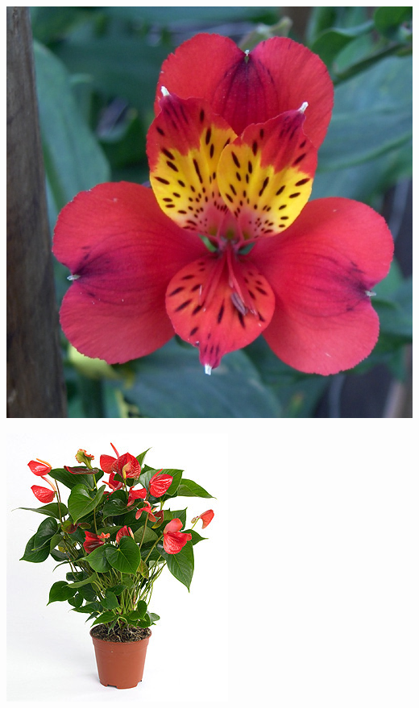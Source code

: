 \documentclass{article}
\begin{document}
\begin{center}
\includegraphics[width=0.9\textheight, angle=90]{../Alstroemeria2.jpg}
\end{center}
\newpage

\begin{center}
\includegraphics[width=0.9\textheight, angle=90]{../Anthurium.jpg}
\end{center}
\newpage
\end{document}
